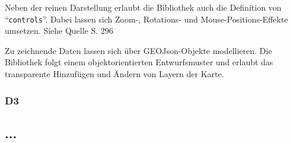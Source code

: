     Neben der reinen Darstellung erlaubt die Bibliothek auch die Definition von  "`\texttt{controls}"'. Dabei lassen sich Zoom-, Rotations- und Mouse-Positions-Effekte umsetzen. Siehe Quelle \cite{openlayersbeginnersguide} S. 296
    
    Zu zeichnende Daten lassen sich über GEOJson-Objekte modellieren. Die Bibliothek folgt einem objektorientierten Entwurfsmuster und erlaubt das transparente Hinzufügen und Ändern von Layern der Karte.
    
    

    \subsubsection{D3}
    
    \subsection{...}

